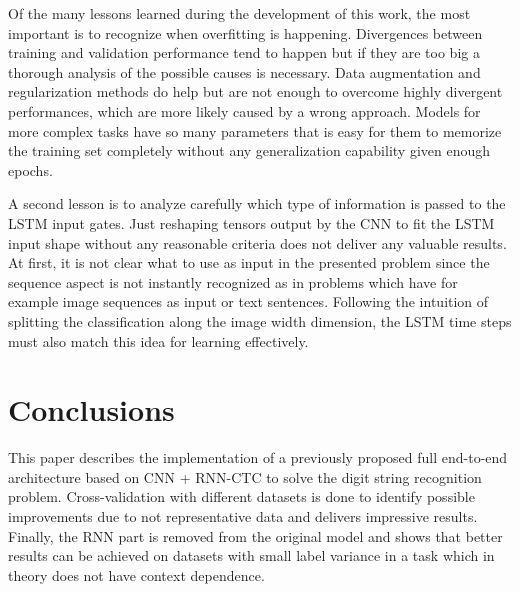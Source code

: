Of the many lessons learned during the development of this work, the most
important is to recognize when overfitting is happening. Divergences between
training and validation performance tend to happen but if they are too big a
thorough analysis of the possible causes is necessary. Data augmentation and
regularization methods do help but are not enough to overcome highly divergent
performances, which are more likely caused by a wrong approach. Models for more
complex tasks have so many parameters that is easy for them to memorize the
training set completely without any generalization capability given enough
epochs. 

A second lesson is to analyze carefully which type of information is passed to
the LSTM input gates. Just reshaping tensors output by the CNN to fit the LSTM
input shape without any reasonable criteria does not deliver any valuable
results. At first, it is not clear what to use as input in the presented problem
since the sequence aspect is not instantly recognized as in problems which have
for example image sequences as input or text sentences. Following the intuition
of splitting the classification along the image width dimension, the LSTM time
steps must also match this idea for learning effectively.

\section{Conclusions}\label{sec:conclusion}

This paper describes the implementation of a previously proposed full end-to-end
architecture based on CNN + RNN-CTC to solve the digit string recognition
problem. Cross-validation with different datasets is done to identify possible
improvements due to not representative data and delivers impressive results.
Finally, the RNN part is removed from the original model and shows that better
results can be achieved on datasets with small label variance in a task which
in theory does not have context dependence. 
